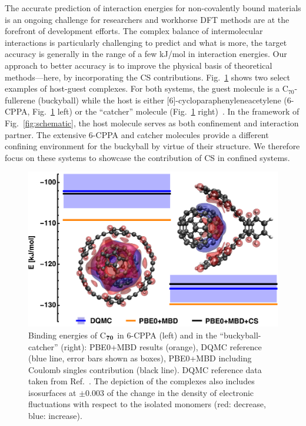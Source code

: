 \documentclass[aps,prl,groupaddress, twocolumn]{revtex4-1}  %
\begin{document}
The accurate prediction of interaction energies for non-covalently bound materials is an ongoing challenge for researchers and workhorse DFT methods are at the forefront of development efforts. The complex balance of intermolecular interactions is particularly challenging to predict and what is more, the target accuracy is generally in the range of a few kJ/mol in interaction energies. Our approach to better accuracy is to improve the physical basis of theoretical methods---here, by incorporating the CS contributions.
Fig.~\ref{fig:flagshipsystems} shows two select examples of host-guest complexes. For both systems, the guest molecule is a C$_{70}$-fullerene (buckyball) while the host is either [6]-cycloparaphenyleneacetylene (6-CPPA, Fig.~\ref{fig:flagshipsystems} left) or the ``catcher'' molecule (Fig.~\ref{fig:flagshipsystems} right)~\cite{s12l_2013}. In the framework of Fig.~\ref{fig:schematic}, the host molecule serves as both confinement and interaction partner. The extensive 6-CPPA and catcher molecules provide a different confining environment for the buckyball by virtue of their structure. We therefore focus on these systems to showcase the contribution of CS in confined systems.
\begin{figure}[htp!]
\centering
\includegraphics[scale=0.68]{Plots/S12L4b.eps}
\caption{Binding energies of C$_{\bf 70}$ in 6-CPPA (left) and in the ``buckyball-catcher'' (right):
PBE0+MBD results (orange), DQMC reference (blue line, error bars shown as boxes), PBE0+MBD including Coulomb singles contribution (black line).
DQMC reference data taken from Ref.~\cite{hermann_ncomm2017}.
The depiction of the complexes also includes isosurfaces at $\pm$0.003 of the change in the density of electronic fluctuations with respect to the isolated monomers (red: decrease, blue: increase).
}\label{fig:flagshipsystems}
\end{figure}
\end{document}
